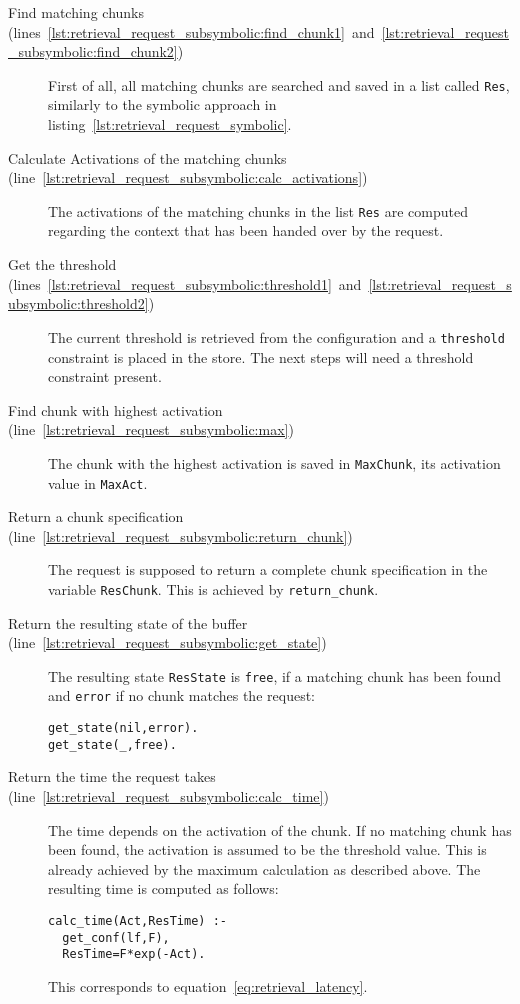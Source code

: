\begin{description}
 \item[Find matching chunks (lines~\ref{lst:retrieval_request_subsymbolic:find_chunk1}~and~\ref{lst:retrieval_request_subsymbolic:find_chunk2})] First of all, all matching chunks are searched and saved in a list called \lstinline|Res|, similarly to the symbolic approach in listing~\ref{lst:retrieval_request_symbolic}.
 \item[Calculate Activations of the matching chunks (line~\ref{lst:retrieval_request_subsymbolic:calc_activations})] The activations of the matching chunks in the list \lstinline|Res| are computed regarding the context that has been handed over by the request.
 \item[Get the threshold (lines~\ref{lst:retrieval_request_subsymbolic:threshold1}~and~\ref{lst:retrieval_request_subsymbolic:threshold2})] The current threshold is retrieved from the configuration and a \lstinline|threshold| constraint is placed in the store. The next steps will need a threshold constraint present.
 \item[Find chunk with highest activation (line~\ref{lst:retrieval_request_subsymbolic:max})] The chunk with the highest activation is saved in \lstinline|MaxChunk|, its activation value in \lstinline|MaxAct|.
 \item[Return a chunk specification (line~\ref{lst:retrieval_request_subsymbolic:return_chunk})] The request is supposed to return a complete chunk specification in the variable \lstinline|ResChunk|. This is achieved by \lstinline|return_chunk|.
 \item[Return the resulting state of the buffer (line~\ref{lst:retrieval_request_subsymbolic:get_state})] The resulting state \lstinline|ResState| is \lstinline|free|, if a matching chunk has been found and \lstinline|error| if no chunk matches the request:
 
\begin{lstlisting}
get_state(nil,error).
get_state(_,free).
\end{lstlisting}

 \item[Return the time the request takes (line~\ref{lst:retrieval_request_subsymbolic:calc_time})] The time depends on the activation of the chunk. If no matching chunk has been found, the activation is assumed to be the threshold value. This is already achieved by the maximum calculation as described above. The resulting time is computed as follows:
 
\begin{lstlisting}
calc_time(Act,ResTime) :-
  get_conf(lf,F),
  ResTime=F*exp(-Act). 
\end{lstlisting}

This corresponds to equation~\eqref{eq:retrieval_latency}.
\end{description}

